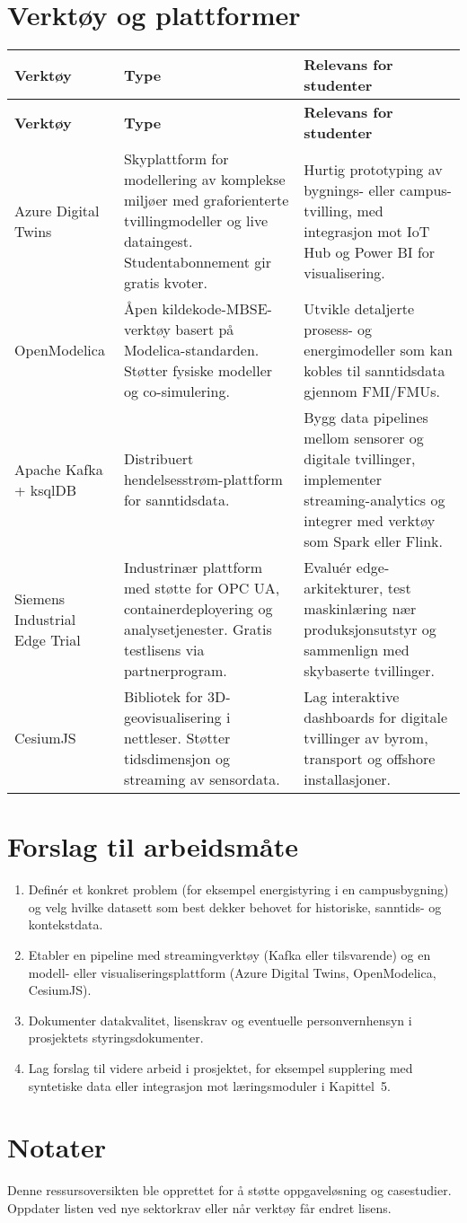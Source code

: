 \section{Verktøy og plattformer}
\begin{longtable}{p{}p{}p{}}
\toprule
\textbf{Verktøy} & \textbf{Type} & \textbf{Relevans for studenter} \\
\midrule
\endfirsthead
\toprule
\textbf{Verktøy} & \textbf{Type} & \textbf{Relevans for studenter} \\
\midrule
\endhead
Azure Digital Twins & Skyplattform for modellering av komplekse miljøer med graforienterte tvillingmodeller og live dataingest. Studentabonnement gir gratis kvoter. & Hurtig prototyping av bygnings- eller campus-tvilling, med integrasjon mot IoT Hub og Power BI for visualisering. \\
\addlinespace
OpenModelica & Åpen kildekode-MBSE-verktøy basert på Modelica-standarden. Støtter fysiske modeller og co-simulering. & Utvikle detaljerte prosess- og energimodeller som kan kobles til sanntidsdata gjennom FMI/FMUs. \\
\addlinespace
Apache Kafka + ksqlDB & Distribuert hendelsesstrøm-plattform for sanntidsdata. & Bygg data pipelines mellom sensorer og digitale tvillinger, implementer streaming-analytics og integrer med verktøy som Spark eller Flink. \\
\addlinespace
Siemens Industrial Edge Trial & Industrinær plattform med støtte for OPC UA, containerdeployering og analysetjenester. Gratis testlisens via partnerprogram. & Evaluér edge-arkitekturer, test maskinlæring nær produksjonsutstyr og sammenlign med skybaserte tvillinger. \\
\addlinespace
CesiumJS & Bibliotek for 3D-geovisualisering i nettleser. Støtter tidsdimensjon og streaming av sensordata. & Lag interaktive dashboards for digitale tvillinger av byrom, transport og offshore installasjoner. \\
\bottomrule
\end{longtable}

\section{Forslag til arbeidsmåte}
\begin{enumerate}
    \item Definér et konkret problem (for eksempel energistyring i en campusbygning) og velg hvilke datasett som best dekker behovet for historiske, sanntids- og kontekstdata.
    \item Etabler en pipeline med streamingverktøy (Kafka eller tilsvarende) og en modell- eller visualiseringsplattform (Azure Digital Twins, OpenModelica, CesiumJS).
    \item Dokumenter datakvalitet, lisenskrav og eventuelle personvernhensyn i prosjektets styringsdokumenter.
    \item Lag forslag til videre arbeid i prosjektet, for eksempel supplering med syntetiske data eller integrasjon mot læringsmoduler i Kapittel~5.
\end{enumerate}

\section{Notater}
Denne ressursoversikten ble opprettet for å støtte oppgaveløsning og casestudier. Oppdater listen ved nye sektorkrav eller når verktøy får endret lisens.

